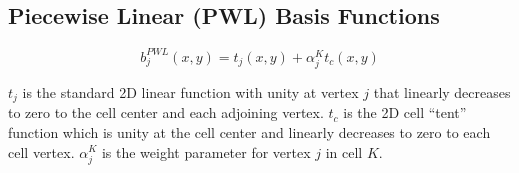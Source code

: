 \subsection{Piecewise Linear (PWL) Basis Functions}
\label{sec::BF_2DLinear_PWL}

\begin{equation}
\label{eq::PWL_2D}
	b_j^{PWL} (x,y) = t_j (x,y) + \alpha_j^K t_c (x,y)
\end{equation}

\noindent $t_j$ is the standard 2D linear function with unity at vertex $j$ that linearly decreases to zero to the cell center and each adjoining vertex. $t_c$ is the 2D cell ``tent'' function which is unity at the cell center and linearly decreases to zero to each cell vertex. $\alpha_{j}^{K}$ is the weight parameter for vertex $j$ in cell $K$. 



